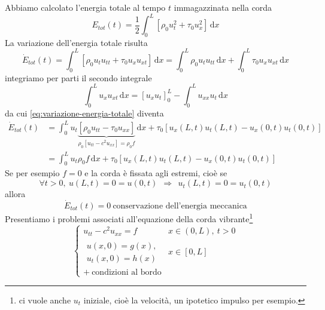 \documentclass[10pt,a4paper,twoside,openright]{book}
\newcommand{\de}{\,\mathrm d}
\newcommand{\dx}{\de x}
\begin{document}
Abbiamo calcolato l'energia totale al tempo $t$ immagazzinata nella corda
\begin{equation*}
    E_{tot}(t) =\frac{1}{2}\int ^{L}_{0}\left[ \rho _{0} u^{2}_{t} +\tau _{0} u^{2}_{x}\right] \dx
\end{equation*}
La variazione dell'energia totale risulta
\begin{equation}
    \dot{E}_{tot}(t) =\int ^{L}_{0}[ \rho _{0} u_{t} u_{tt} +\tau _{0} u_{x} u_{xt}] \dx=\int ^{L}_{0} \rho _{0} u_{t} u_{tt} \dx+\int ^{L}_{0} \tau _{0} u_{x} u_{xt} \dx
    \label{eq:variazione-energia-totale}
\end{equation}
integriamo per parti il secondo integrale
\begin{equation*}
    \int ^{L}_{0} u_{x} u_{xt} \dx=[ u_{x} u_{t}]^{L}_{0} -\int ^{L}_{0} u_{xx} u_{t} \dx
\end{equation*}
da cui \eqref{eq:variazione-energia-totale} diventa
\begin{align*}
    \dot{E}_{tot}(t) & =\int ^{L}_{0} u_{t}\underbrace{[ \rho _{0} u_{tt} -\tau _{0} u_{xx}]}_{\rho _{0}\left[ u_{tt} -c^{2} u_{xx}\right] =\rho _{0} f} \dx+\tau _{0}[ u_{x}(L,t) u_{t}(L,t) -u_{x}(0,t) u_{t}(0,t)] \\
                     & =\int ^{L}_{0} u_{t} \rho _{0} f\dx+\tau _{0}[ u_{x}(L,t) u_{t}(L,t) -u_{x}(0,t) u_{t}(0,t)]
\end{align*}
Se per esempio $f=0$ e la corda è fissata agli estremi, cioè se
\begin{equation*}
    \forall t >0,\ u(L,t) =0=u(0,t) \ \ \Rightarrow \ \ u_{t}(L,t) =0=u_{t}(0,t)
\end{equation*}
allora
\begin{equation*}
    \dot{E}_{tot}(t) =0\ \text{conservazione dell'energia meccanica}
\end{equation*}
Presentiamo i problemi associati all'equazione della corda vibrante\footnote{ci vuole anche $u_{t}$ iniziale, cioè la velocità, un ipotetico impulso per esempio.}
\begin{equation*}
    \begin{cases}
        u_{tt} -c^{2} u_{xx} =f       & x\in (0,L) ,\ t >0 \\
        \begin{array}{l}
            u(x,0) =g(x) , \\
            u_{t}(x,0) =h(x)
        \end{array}   & x\in [ 0,L]        \\
        +\ \text{condizioni al bordo} &
    \end{cases}
\end{equation*}
\end{document}

